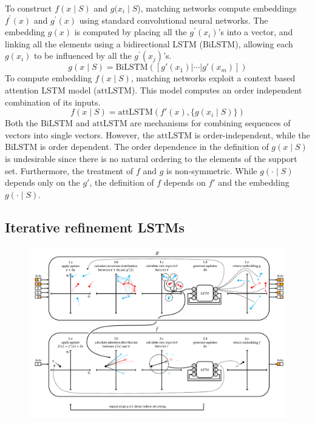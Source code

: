 \documentclass[journal=jacsat,manuscript=article]{achemso}
\begin{document}
To construct $f(x\mid S)$ and $g(x_i\mid S$), matching networks\cite{vinyals2016matching} compute embeddings $f^\prime(x)$ and $g^\prime(x)$ using standard convolutional neural networks. The embedding $g(x)$ is computed by placing all the $g^\prime(x_i)$'s into a vector, and linking all the elements using a bidirectional LSTM \cite{hochreiter1997long, graves2013hybrid} ($\text{BiLSTM}$), allowing each $g(x_i)$ to be influenced by all the $g^\prime(x_j)$'s. 
\[
g(x\mid S) =\text{BiLSTM}([g'(x_1)|\cdots|g'(x_m)])
\]
To compute embedding $f(x\mid S)$, matching networks exploit a context based attention LSTM model \cite{vinyals2015order} ($\text{attLSTM}$). This model computes an order independent combination of its inputs.
\[
f(x\mid S) = \text{attLSTM}(f'(x), \{g(x_i\mid S)\})
\]
Both the $\text{BiLSTM}$ and $\text{attLSTM}$ are mechanisms for combining sequences of vectors into single vectors. However, the $\text{attLSTM}$ is order-independent, while the $\text{BiLSTM}$ is order dependent. The order dependence in the definition of $g(x\mid S)$ is undesirable since there is no natural ordering to the elements of the support set. Furthermore, the treatment of $f$ and $g$ is non-symmetric. While $g(\cdot \mid S)$ depends only on the $g'$, the definition of $f$ depends on $f'$ and the embedding $g(\cdot \mid S)$. %




\subsection{Iterative refinement LSTMs}
\begin{figure}[h]
\includegraphics[width=\textwidth]{resiembedding_graphic_v2.png}
\label{fig:resiembed}
\end{figure}
\end{document}
